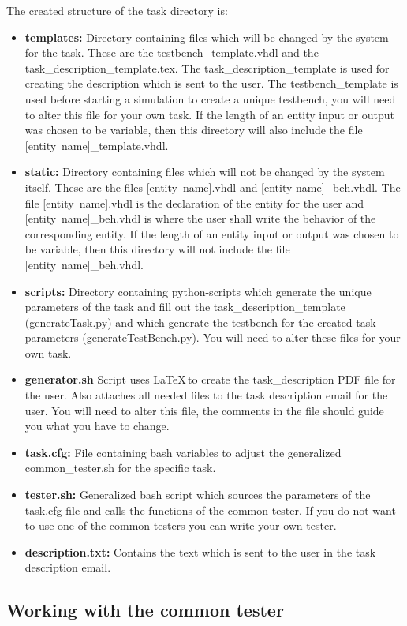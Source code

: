 The created structure of the task directory is:
\begin{itemize}
\item {\bf templates:} Directory containing files which will be changed by the system for the task. These are the testbench\_template.vhdl and the task\_description\_template.tex. The task\_description\_template is used for creating the description which is sent to the user. The testbench\_template is used before starting a simulation to create a unique testbench, you will need to alter this file for your own task. If the length of an entity input or output was chosen to be variable, then this directory will also include the file \mbox{[entity name]\_template.vhdl}.
\item {\bf static:} Directory containing files which will not be changed by the system itself. These are the files \mbox{[entity name].vhdl} and [entity name]\_beh.vhdl. The file \mbox{[entity name].vhdl} is the declaration of the entity for the user and \mbox{[entity name]\_beh.vhdl} is where the user shall write the behavior of the corresponding entity. If the length of an entity input or output was chosen to be variable, then this directory will not include the file \mbox{[entity name]\_beh.vhdl}.
\item {\bf scripts:} Directory containing python-scripts which generate the unique parameters of the task and fill out the task\_description\_template (generateTask.py) and which generate the testbench for the created task parameters (generateTestBench.py). You will need to alter these files for your own task.
\item {\bf generator.sh} Script uses \LaTeX\,to create the task\_description PDF file for the user. Also attaches all needed files to the task description email for the user. You will need to alter this file, the comments in the file should guide you what you have to change.
\item {\bf task.cfg:} File containing bash variables to adjust the generalized common\_tester.sh for the specific task.
\item {\bf tester.sh:} Generalized bash script which sources the parameters of the task.cfg file and calls the functions of the common tester. If you do not want to use one of the common testers you can write your own tester.
\item {\bf description.txt:} Contains the text which is sent to the user in the task description email.
\end{itemize}


\subsection{Working with the common tester} \label{sub:testercommon}

